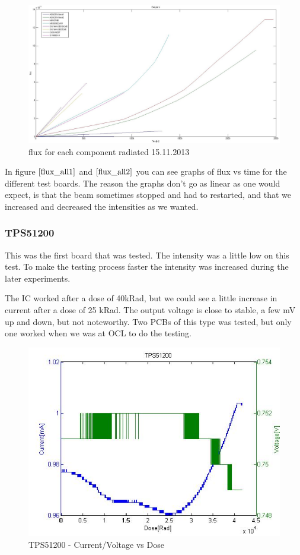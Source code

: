 \documentclass[12pt]{article}
\numberwithin{figure}{section}
\begin{document}
\begin{figure}[!htbp]
  \centering
  \includegraphics[width=\textwidth]{Flux_vs_time_all.jpg}
  \caption{flux for each component radiated 15.11.2013}
  \label{flux_all2}
\end{figure}
\newpage
In figure $\ref{flux_all1}$ and $\ref{flux_all2}$ you can see graphs of flux vs time for the different test boards. The reason the graphs don't go as linear as one would expect, is that the beam sometimes stopped and had to restarted, and that we increased and decreased the intensities as we wanted.

\FloatBarrier

\subsubsection{TPS51200}
This was the first board that was tested.
The intensity was a little low on this test.
To make the testing process faster the intensity was increased during the later experiments.

The IC worked after a dose of 40kRad, but we could see a little increase in current after a dose of 25 kRad. The output voltage is close to stable, a few mV up and down, but not noteworthy.
Two PCBs of this type was tested, but only one worked when we was at OCL to do the testing.

\begin{figure}[!htbp]
\centering
  \includegraphics[width=.49\textwidth]{current_voltage_tps.jpg}
  \caption{TPS51200 - Current/Voltage vs Dose}
  \label{TPS51200_1}
\end{figure}
\end{document}
